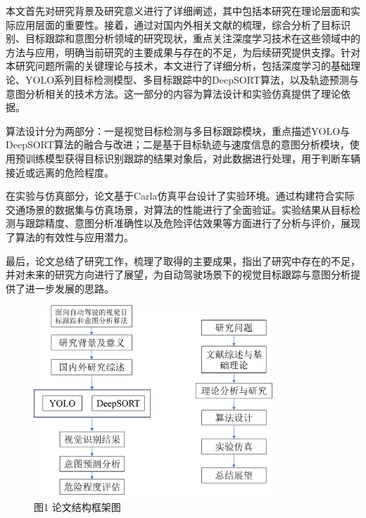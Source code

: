 本文首先对研究背景及研究意义进行了详细阐述，其中包括本研究在理论层面和实际应用层面的重要性。接着，通过对国内外相关文献的梳理，综合分析了目标识别、目标跟踪和意图分析领域的研究现状，重点关注深度学习技术在这些领域中的方法与应用，明确当前研究的主要成果与存在的不足，为后续研究提供支撑。针对本研究问题所需的关键理论与技术，本文进行了详细分析，包括深度学习的基础理论、YOLO系列目标检测模型、多目标跟踪中的DeepSORT算法，以及轨迹预测与意图分析相关的技术方法。这一部分的内容为算法设计和实验仿真提供了理论依据。

算法设计分为两部分：一是视觉目标检测与多目标跟踪模块，重点描述YOLO与DeepSORT算法的融合与改进；二是基于目标轨迹与速度信息的意图分析模块，使用预训练模型获得目标识别跟踪的结果对象后，对此数据进行处理，用于判断车辆接近或远离的危险程度。

在实验与仿真部分，论文基于Carla仿真平台设计了实验环境。通过构建符合实际交通场景的数据集与仿真场景，对算法的性能进行了全面验证。实验结果从目标检测与跟踪精度、意图分析准确性以及危险评估效果等方面进行了分析与评价，展现了算法的有效性与应用潜力。

最后，论文总结了研究工作，梳理了取得的主要成果，指出了研究中存在的不足，并对未来的研究方向进行了展望，为自动驾驶场景下的视觉目标跟踪与意图分析提供了进一步发展的思路。
\begin{figure}[htbp]
    \centering
    \includegraphics[width=0.8\textwidth]{images/p1_struct.pdf}  %
    \caption{图1 论文结构框架图}
    \label{fig:example_image}  %
\end{figure}




\begin{tabular}{l l}
\end{tabular}